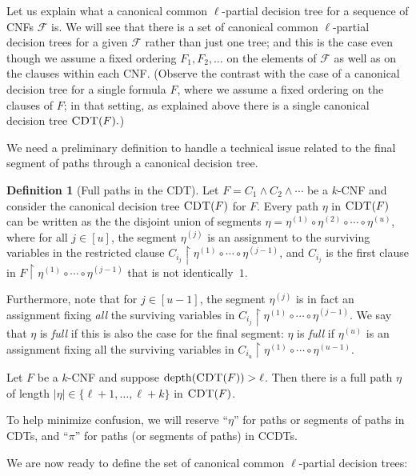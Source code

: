 \documentclass[11pt]{article}
\numberwithin{equation}{section}
\theoremstyle{definition}
\newtheorem{definition}[theorem]{Definition}
\theoremstyle{plain}
\theoremstyle{plain}
\newcommand{\uhr}{\upharpoonright}
\newcommand{\CDT}{\textsc{CDT}}
\newcommand{\depth}{\mathrm{depth}}
\begin{document}
Let us  explain what a canonical common $\ell$-partial decision tree for a {sequence} of CNFs $\mathscr{F}$ is. We will see that there is a set of canonical common $\ell$-partial decision trees for a given $\mathscr{F}$ rather than just one tree; and this is the case even though we assume a fixed ordering $F_1,F_2,\dots$ on the elements of $\mathscr{F}$ as well as on the clauses within each CNF.  (Observe the contrast with the case of a canonical decision tree for a single formula $F$, where we assume a fixed ordering on the clauses of $F$; in that setting, as explained above there is a single canonical decision tree $\CDT(F).$)

We need a preliminary definition to handle a technical issue related to the final segment of paths through a canonical decision tree.

\begin{definition}[Full paths in the CDT]
\label{def:full}
Let $F = C_1 \wedge C_2 \wedge \cdots$ be a $k$-CNF and consider the canonical decision tree $\CDT(F)$ for $F$. Every path $\eta$ in $\CDT(F)$ can be written as the the disjoint union of segments $\eta = \eta^{(1)} \circ \eta^{(2)} \circ \cdots \circ \eta^{(u)}$,  where for all $j\in [u]$, the segment $\eta^{(j)}$ is an assignment to the surviving variables in the restricted clause $C_{i_j} \uhr \eta^{(1)} \circ \cdots \circ \eta^{(j-1)}$, and $C_{i_j}$ is the first clause in $F \uhr \eta^{(1)} \circ \cdots \circ \eta^{(j-1)}$ that is not identically~$1$.

Furthermore, note that for $j\in [u-1]$, the segment $\eta^{(j)}$ is in fact an assignment fixing \emph{all} the surviving variables in $C_{i_j} \uhr \eta^{(1)} \circ \cdots \circ \eta^{(j-1)}$.  We say that $\eta$ is \emph{full} if this is also the case for the final segment: $\eta$ is \emph{full} if $\eta^{(u)}$ is an assignment fixing all the surviving variables in $C_{i_u} \uhr \eta^{(1)} \circ \cdots \circ \eta^{(u-1)}$. 
\end{definition} 

\begin{observation}
Let $F$ be a $k$-CNF and suppose $\depth(\CDT(F)) > \ell$. Then there is a full path $\eta$ of length $|\eta| \in \{\ell+1,\ldots,\ell+k\}$ in $\CDT(F)$. 
\end{observation} 


To help minimize confusion, we will reserve ``$\eta$'' for paths or segments of paths in CDTs, and ``$\pi$'' for paths (or segments of paths) in CCDTs.

We are now ready to define the set of canonical common $\ell$-partial decision trees:
\end{document}
